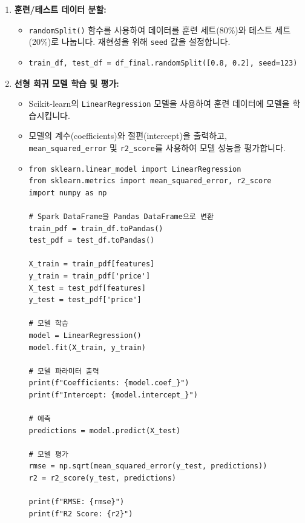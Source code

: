 \documentclass[11pt,a4paper]{article}
\theoremstyle{definition}
\newcommand{\code}[1]{\texttt{#1}}
\begin{document}
\begin{enumerate}
\begin{itemize}
\begin{lstlisting}[caption=특징 엔지니어링 코드]
# 최종 Spark DataFrame으로 변환
df_final = psdf_final.to_spark()
display(df_final)
        \end{lstlisting}
    \end{itemize}
    \item \textbf{훈련/테스트 데이터 분할:}
    \begin{itemize}
        \item \code{randomSplit()} 함수를 사용하여 데이터를 훈련 세트(80\%)와 테스트 세트(20\%)로 나눕니다. 재현성을 위해 \code{seed} 값을 설정합니다.
        \item 
        \begin{lstlisting}[caption=훈련/테스트 데이터 분할 코드]
train_df, test_df = df_final.randomSplit([0.8, 0.2], seed=123)
        \end{lstlisting}
    \end{itemize}
    \item \textbf{선형 회귀 모델 학습 및 평가:}
    \begin{itemize}
        \item Scikit-learn의 \code{LinearRegression} 모델을 사용하여 훈련 데이터에 모델을 학습시킵니다.
        \item 모델의 계수(coefficients)와 절편(intercept)을 출력하고, \code{mean_squared_error} 및 \code{r2_score}를 사용하여 모델 성능을 평가합니다.
        \item 
        \begin{lstlisting}[caption=선형 회귀 모델 학습 및 평가 코드]
from sklearn.linear_model import LinearRegression
from sklearn.metrics import mean_squared_error, r2_score
import numpy as np

# Spark DataFrame을 Pandas DataFrame으로 변환
train_pdf = train_df.toPandas()
test_pdf = test_df.toPandas()

X_train = train_pdf[features]
y_train = train_pdf['price']
X_test = test_pdf[features]
y_test = test_pdf['price']

# 모델 학습
model = LinearRegression()
model.fit(X_train, y_train)

# 모델 파라미터 출력
print(f"Coefficients: {model.coef_}")
print(f"Intercept: {model.intercept_}")

# 예측
predictions = model.predict(X_test)

# 모델 평가
rmse = np.sqrt(mean_squared_error(y_test, predictions))
r2 = r2_score(y_test, predictions)

print(f"RMSE: {rmse}")
print(f"R2 Score: {r2}")
        \end{lstlisting}
    \end{itemize}
\end{enumerate}
\end{document}
